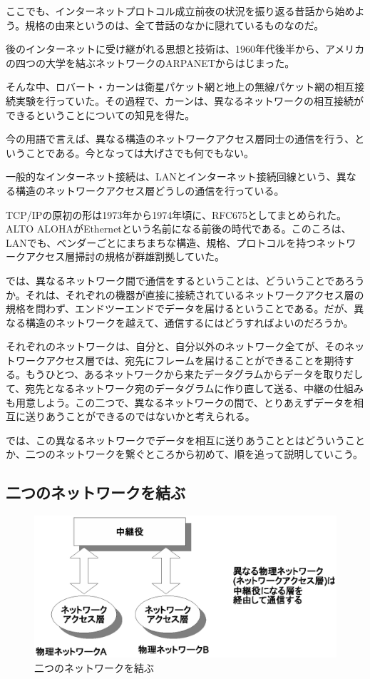 ここでも、インターネットプロトコル成立前夜の状況を振り返る昔話から始めよう。規格の由来というのは、全て昔話のなかに隠れているものなのだ。

後のインターネットに受け継がれる思想と技術は、1960年代後半から、アメリカの四つの大学を結ぶネットワークのARPANETからはじまった。

そんな中、ロバート・カーンは衛星パケット網と地上の無線パケット網の相互接続実験を行っていた。その過程で、カーンは、異なるネットワークの相互接続ができるということについての知見を得た。

今の用語で言えば、異なる構造のネットワークアクセス層同士の通信を行う、ということである。今となっては大げさでも何でもない。

一般的なインターネット接続は、LANとインターネット接続回線という、異なる構造のネットワークアクセス層どうしの通信を行っている。

TCP/IPの原初の形は1973年から1974年頃に、RFC675としてまとめられた。ALTO ALOHAがEthernetという名前になる前後の時代である。このころは、LANでも、ベンダーごとにまちまちな構造、規格、プロトコルを持つネットワークアクセス層掃討の規格が群雄割拠していた。

では、異なるネットワーク間で通信をするということは、どういうことであろうか。それは、それぞれの機器が直接に接続されているネットワークアクセス層の規格を問わず、エンドツーエンドでデータを届けるということである。だが、異なる構造のネットワークを越えて、通信するにはどうすればよいのだろうか。

それぞれのネットワークは、自分と、自分以外のネットワーク全てが、そのネットワークアクセス層では、宛先にフレームを届けることができることを期待する。もうひとつ、あるネットワークから来たデータグラムからデータを取りだして、宛先となるネットワーク宛のデータグラムに作り直して送る、中継の仕組みも用意しよう。この二つで、異なるネットワークの間で、とりあえずデータを相互に送りあうことができるのではないかと考えられる。

では、この異なるネットワークでデータを相互に送りあうこととはどういうことか、二つのネットワークを繋ぐところから初めて、順を追って説明していこう。

\subsection{二つのネットワークを結ぶ}

\begin{figure}[htbp]
	\includegraphics[width=12cm,clip]{draw/ip_basic2.eps}
	\caption{二つのネットワークを結ぶ}
	\label{fig:ip_basic2}
\end{figure}

